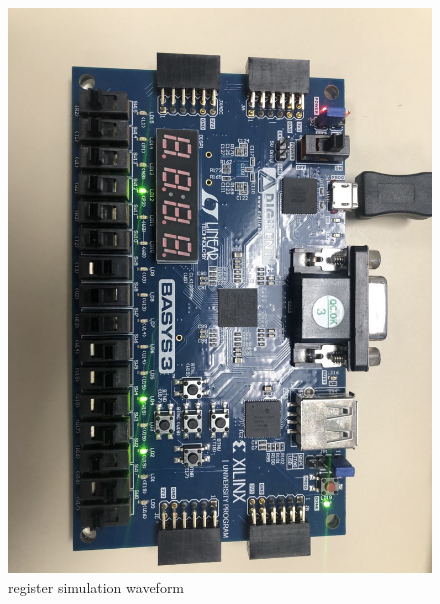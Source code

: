 \documentclass[11pt]{article}
\begin{document}
\begin{figure}[ht]\centering
	\includegraphics[width= \textwidth ]{bb5.png}
	\caption{register simulation waveform}
	\label{fig: bb5}
\end{figure}
\end{document}
